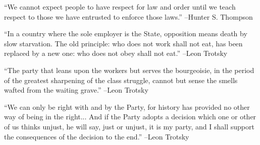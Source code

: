 \documentclass{article}%
\begin{document}
\linebreak%
\vspace{1mm}%
\begin{minipage}{\textwidth}%
\flushleft%
“We cannot expect people to have respect for law and order until we teach respect to those we have entrusted to enforce those laws.”%
\linebreak%
\vspace{1mm}%
–Hunter S. Thompson%
\linebreak%
\vspace{1mm}%
\end{minipage}%
\linebreak%
\vspace{1mm}%
\begin{minipage}{\textwidth}%
\flushleft%
“In a country where the sole employer is the State, opposition means death by slow starvation. The old principle: who does not work shall not eat, has been replaced by a new one: who does not obey shall not eat.”%
\linebreak%
\vspace{1mm}%
–Leon Trotsky%
\linebreak%
\vspace{1mm}%
\end{minipage}%
\linebreak%
\vspace{1mm}%
\begin{minipage}{\textwidth}%
\flushleft%
“The party that leans upon the workers but serves the bourgeoisie, in the period of the greatest sharpening of the class struggle, cannot but sense the smells wafted from the waiting grave.”%
\linebreak%
\vspace{1mm}%
–Leon Trotsky%
\linebreak%
\vspace{1mm}%
\end{minipage}%
\linebreak%
\vspace{1mm}%
\begin{minipage}{\textwidth}%
\flushleft%
“We can only be right with and by the Party, for history has provided no other way of being in the right... And if the Party adopts a decision which one or other of us thinks unjust, he will say, just or unjust, it is my party, and I shall support the consequences of the decision to the end.”%
\linebreak%
\vspace{1mm}%
–Leon Trotsky%
\linebreak%
\vspace{1mm}%
\end{minipage}%
\end{document}
